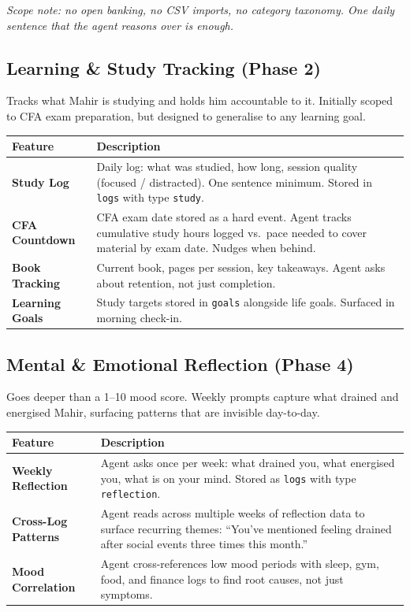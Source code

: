 \documentclass[12pt, a4paper]{article}
\begin{document}
\textit{Scope note: no open banking, no CSV imports, no category taxonomy. One daily sentence that the agent reasons over is enough.}

\subsection{Learning \& Study Tracking (Phase 2)}

Tracks what Mahir is studying and holds him accountable to it. Initially scoped to CFA exam preparation, but designed to generalise to any learning goal.

\begin{longtable}{>{\bfseries}p{4cm} p{10cm}}
\toprule
Feature & Description \\
\midrule
Study Log & Daily log: what was studied, how long, session quality (focused / distracted). One sentence minimum. Stored in \texttt{logs} with type \texttt{study}. \\
\addlinespace
CFA Countdown & CFA exam date stored as a hard event. Agent tracks cumulative study hours logged vs.\ pace needed to cover material by exam date. Nudges when behind. \\
\addlinespace
Book Tracking & Current book, pages per session, key takeaways. Agent asks about retention, not just completion. \\
\addlinespace
Learning Goals & Study targets stored in \texttt{goals} alongside life goals. Surfaced in morning check-in. \\
\bottomrule
\end{longtable}

\subsection{Mental \& Emotional Reflection (Phase 4)}

Goes deeper than a 1--10 mood score. Weekly prompts capture what drained and energised Mahir, surfacing patterns that are invisible day-to-day.

\begin{longtable}{>{\bfseries}p{4cm} p{10cm}}
\toprule
Feature & Description \\
\midrule
Weekly Reflection & Agent asks once per week: what drained you, what energised you, what is on your mind. Stored as \texttt{logs} with type \texttt{reflection}. \\
\addlinespace
Cross-Log Patterns & Agent reads across multiple weeks of reflection data to surface recurring themes: ``You've mentioned feeling drained after social events three times this month.'' \\
\addlinespace
Mood Correlation & Agent cross-references low mood periods with sleep, gym, food, and finance logs to find root causes, not just symptoms. \\
\bottomrule
\end{longtable}
\end{document}
